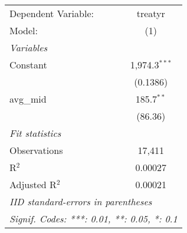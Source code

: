 
\begingroup
\centering
\begin{tabular}{lc}
   \tabularnewline \midrule \midrule
   Dependent Variable: & treatyr\\  
   Model:              & (1)\\  
   \midrule
   \emph{Variables}\\
   Constant            & 1,974.3$^{***}$\\   
                       & (0.1386)\\   
   avg\_mid            & 185.7$^{**}$\\   
                       & (86.36)\\   
   \midrule
   \emph{Fit statistics}\\
   Observations        & 17,411\\  
   R$^2$               & 0.00027\\  
   Adjusted R$^2$      & 0.00021\\  
   \midrule \midrule
   \multicolumn{2}{l}{\emph{IID standard-errors in parentheses}}\\
   \multicolumn{2}{l}{\emph{Signif. Codes: ***: 0.01, **: 0.05, *: 0.1}}\\
\end{tabular}
\par\endgroup


